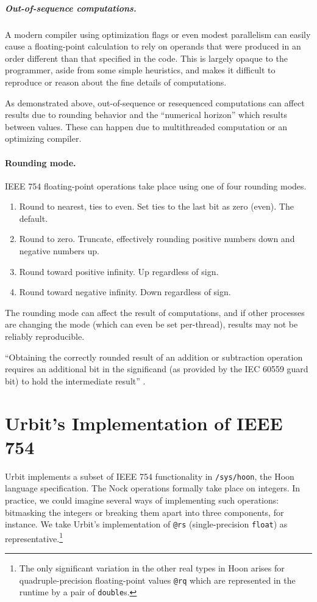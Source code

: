 \documentclass[twoside]{article}
\begin{document}
\subparagraph{Out-of-sequence computations.}

A modern compiler using optimization flags or even modest parallelism can easily cause a floating-point calculation to rely on operands that were produced in an order different than that specified in the code.  This is largely opaque to the programmer, aside from some simple heuristics, and makes it difficult to reproduce or reason about the fine details of computations.

As demonstrated above, out-of-sequence or resequenced computations can affect results due to rounding behavior and the “numerical horizon” which results between values.  These can happen due to multithreaded computation or an optimizing compiler.

\paragraph{Rounding mode.}

IEEE 754 floating-point operations take place using one of four rounding modes.

\begin{enumerate}
  \item  Round to nearest, ties to even.  Set ties to the last bit as zero (even).  The default.
  \item  Round to zero.  Truncate, effectively rounding positive numbers down and negative numbers up.
  \item  Round toward positive infinity.  Up regardless of sign.
  \item  Round toward negative infinity.  Down regardless of sign.
\end{enumerate}

\noindent
The rounding mode can affect the result of computations, and if other processes are changing the mode (which can even be set per-thread), results may not be reliably reproducible.

“Obtaining the correctly rounded result of an addition or subtraction operation requires an additional bit in the significand (as provided by the IEC 60559 guard bit) to hold the intermediate result” \citep[p.~65]{Jones2008}.


\section{Urbit's Implementation of IEEE 754}

Urbit implements a subset of IEEE 754 functionality in \texttt{/sys/hoon}, the Hoon language specification.  The Nock operations formally take place on integers.  In practice, we could imagine several ways of implementing such operations:  bitmasking the integers or breaking them apart into three components, for instance.  We take Urbit's implementation of \texttt{@rs} (single-precision \texttt{float}) as representative.\footnote{The only significant variation in the other real types in Hoon arises for quadruple-precision floating-point values \texttt{@rq} which are represented in the runtime by a pair of \texttt{double}s.}
\end{document}
